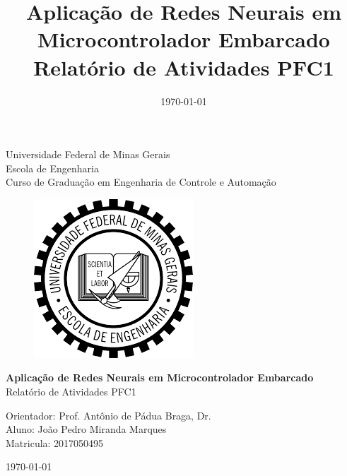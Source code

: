 \begin{titlepage}
    \begin{center}
           
    {\large Universidade Federal de Minas Gerais\\
    Escola de Engenharia \\
    Curso de Graduação em Engenharia de Controle e Automação\\}
    \vfill

    \begin{figure}[h]
        \centering
        \includegraphics[scale=0.7]{images/brasao_ufmg.png}
    \end{figure}
    \vspace{2cm}


    {\bf\Large Aplicação de Redes Neurais em Microcontrolador Embarcado\\}
    \vspace{1cm} 
    {\Large Relatório de Atividades PFC1}
    \vspace{2cm}  
    
    {\large Orientador: Prof. Antônio de Pádua Braga, Dr.}\\

    
    {\large Aluno: João Pedro Miranda Marques \\
    Matricula: 2017050495}
    \vspace{2cm}  

    \today
    \vspace{2cm}  
       

    \large \date{\today}
    \end{center}
    
    \end{titlepage}
    
    \newpage
    \clearpage
    \thispagestyle{empty}
    
    \cleardoublepage


\title{
    Aplicação de Redes Neurais em Microcontrolador Embarcado \\
    \large Relatório de Atividades PFC1}


